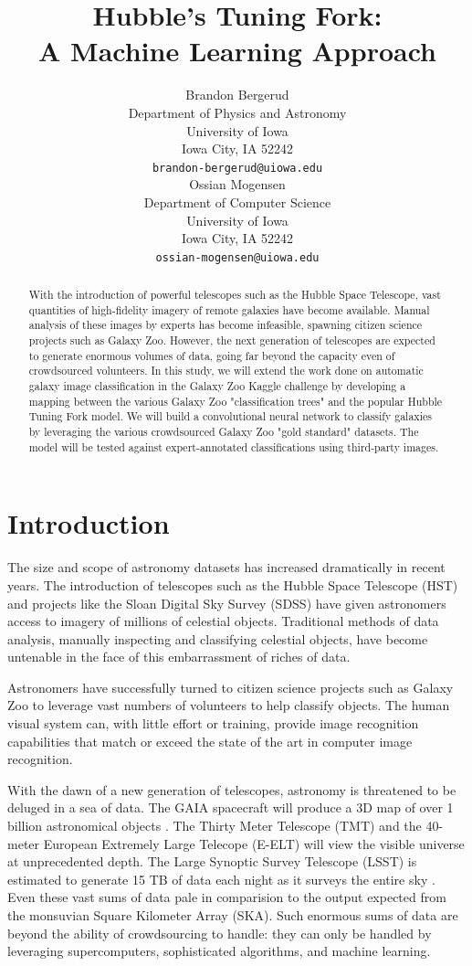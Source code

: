 \documentclass{article}
\title{Hubble's Tuning Fork: \\A Machine Learning Approach}
\author{
  Brandon Bergerud \\
  Department of Physics and Astronomy\\
  University of Iowa\\
  Iowa City, IA  52242 \\
  \texttt{brandon-bergerud@uiowa.edu} \\
  \And
  Ossian Mogensen \\
  Department of Computer Science \\
  University of Iowa \\
  Iowa City, IA  52242 \\
  \texttt{ossian-mogensen@uiowa.edu} \\
}
\begin{document}

\maketitle

\begin{abstract}
With the introduction of powerful telescopes such as the Hubble Space Telescope, vast quantities of high-fidelity imagery of remote galaxies have become available. Manual analysis of these images by experts has become infeasible, spawning citizen science projects such as Galaxy Zoo. However, the next generation of telescopes are expected to generate enormous volumes of data, going far beyond the capacity even of crowdsourced volunteers. In this study, we will extend the work done on automatic galaxy image classification in the Galaxy Zoo Kaggle challenge by developing a mapping between the various Galaxy Zoo "classification trees" and the popular Hubble Tuning Fork model. We will build a convolutional neural network to classify galaxies by leveraging the various crowdsourced Galaxy Zoo "gold standard" datasets. The model will be tested against expert-annotated classifications using third-party images.
\end{abstract}

\section{Introduction}
The size and scope of astronomy datasets has increased dramatically in recent years. The introduction of telescopes such as the Hubble Space Telescope (HST) and projects like the Sloan Digital Sky Survey (SDSS) have given astronomers access to imagery of millions of celestial objects. Traditional methods of data analysis, manually inspecting and classifying celestial objects, have become untenable in the face of this embarrassment of riches of data. 

Astronomers have successfully turned to citizen science projects such as Galaxy Zoo to leverage vast numbers of volunteers to help classify objects. The human visual system can, with little effort or training, provide image recognition capabilities that match or exceed the state of the art in computer image recognition. 

With the dawn of a new generation of telescopes, astronomy is threatened to be deluged in a sea of data. The GAIA spacecraft will produce a 3D map of over 1 billion astronomical objects \citep{2016A&A...595A...1G}. The Thirty Meter Telescope (TMT) \citep{2015RAA....15.1945S} and the 40-meter European Extremely Large Telecope (E-ELT) will view the visible universe at unprecedented depth. The Large Synoptic Survey Telescope (LSST) is estimated to generate 15 TB of data each night as it surveys the entire sky \citep{2009AAS...21346003I}. Even these vast sums of data pale in comparision to the output expected from the monsuvian Square Kilometer Array (SKA). Such enormous sums of data are beyond the ability of crowdsourcing to handle: they can only be handled by leveraging supercomputers, sophisticated algorithms, and machine learning.
\end{document}
